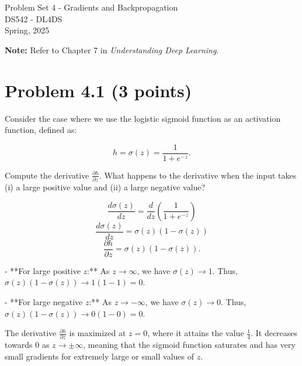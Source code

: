 \documentclass[10pt]{article}
\begin{document}
\begin{center}
    \LARGE {Problem Set 4 - Gradients and Backpropagation} \\[1em]
    \Large{DS542 - DL4DS} \\[0.5em]
    \large Spring, 2025
\end{center}

\vspace{2em}

\noindent\textbf{Note:} Refer to Chapter 7 in \textit{Understanding Deep Learning}.

\vspace{2em}

\section*{Problem 4.1 (3 points)}

Consider the case where we use the logistic sigmoid function as an activation function, defined as:

\begin{equation}
h = \sigma(z) = \frac{1}{1 + e^{-z}}.
\end{equation}

\noindent Compute the derivative \( \frac{\partial h}{\partial z} \). What happens
to the derivative when the input takes (i) a large positive value and (ii) a large negative value?


\vspace{5em}
\[
\frac{d\sigma(z)}{dz} = \frac{d}{dz} \left( \frac{1}{1 + e^{-z}} \right)
\]
\[
\frac{d\sigma(z)}{dz} = \sigma(z) (1 - \sigma(z))
\]
\begin{equation}
    \frac{\partial h}{\partial z} = \sigma(z) (1 - \sigma(z)).
\end{equation}

- **For large positive \( z \):**  
  As \( z \to \infty \), we have \( \sigma(z) \to 1 \).  
  Thus, \( \sigma(z) (1 - \sigma(z)) \to 1(1 - 1) = 0 \).

  - **For large negative \( z \):**  
  As \( z \to -\infty \), we have \( \sigma(z) \to 0 \).  
  Thus, \( \sigma(z) (1 - \sigma(z)) \to 0(1 - 0) = 0 \).

  \vspace{2em}
  The derivative \( \frac{\partial h}{\partial z} \) is maximized at \( z = 0 \), where it attains the value \( \frac{1}{4} \). It decreases towards 0 as \( z \to \pm\infty \), meaning that the sigmoid function saturates and has very small gradients for extremely large or small values of \( z \).
\end{document}
